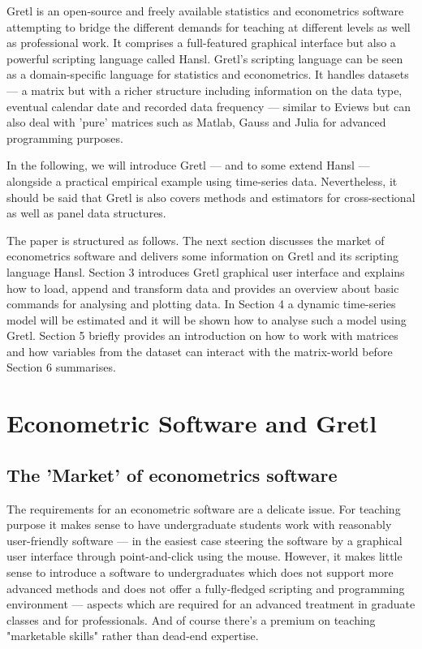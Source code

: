 \documentclass[11pt]{article}
\begin{document}
Gretl is an open-source and freely available statistics and econometrics software attempting to bridge the different demands for teaching at different levels as well as professional work. It comprises a full-featured graphical interface but also a powerful scripting language called Hansl. Gretl's scripting language can be seen as a domain-specific language for statistics and econometrics. It handles datasets --- a matrix but with a richer structure including information on the data type, eventual calendar date and recorded data frequency --- similar to Eviews but can also deal with 'pure' matrices such as Matlab, Gauss and Julia for advanced programming purposes.

In the following, we will introduce Gretl --- and to some extend Hansl --- alongside a practical empirical example using time-series data. Nevertheless, it should be said that Gretl is also covers methods and estimators for cross-sectional as well as panel data structures.

The paper is structured as follows. The next section discusses the market of econometrics software and delivers some information on Gretl and its scripting language Hansl. Section 3 introduces Gretl graphical user interface and explains how to load, append and transform data and provides an overview about basic commands for analysing and plotting data. In Section 4 a dynamic time-series model will be estimated and it will be shown how to analyse such a model using Gretl. Section 5 briefly provides an introduction on how to work with matrices and how variables from the dataset can interact with the matrix-world before Section 6 summarises. 


\section{Econometric Software and Gretl}

\subsection{The 'Market' of econometrics software}
The requirements for an econometric software are a delicate issue. For teaching purpose it makes sense to have undergraduate students work with reasonably user-friendly software --- in the easiest case steering the software by a graphical user interface through point-and-click using the mouse. However, it makes little sense to introduce a software to undergraduates which does not support more advanced methods and does not offer a fully-fledged scripting and programming environment --- aspects which are required for an advanced treatment in graduate classes and for professionals. And of course there's a premium on teaching "marketable skills" rather than dead-end expertise.
\end{document}
